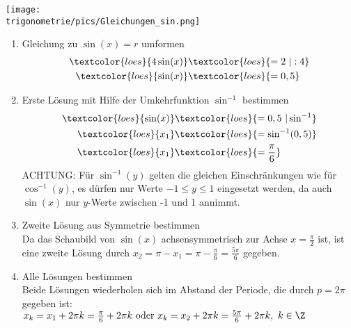 \begin{minipage}{\textwidth}
	\texttt{[image: \\trigonometrie/pics/Gleichungen\_sin.png]}\\
\end{minipage}
\begin{enumerate}
	\item Gleichung zu \(\sin(x)=r\) umformen
	\begin{align*}
		\textcolor{loes}{4\sin(x)}&\textcolor{loes}{=2\ \vert :4}\\
		\textcolor{loes}{\sin(x)}&\textcolor{loes}{=0,5}\\
	\end{align*}
	\item Erste Lösung mit Hilfe der Umkehrfunktion \(\sin^{-1}\) bestimmen
	\begin{align*}
		\textcolor{loes}{\sin(x)}&\textcolor{loes}{=0,5\ \vert \sin^{-1}}\\
		\textcolor{loes}{x_1}&\textcolor{loes}{=\sin^{-1}(0,5)}\\
		\textcolor{loes}{x_1}&\textcolor{loes}{=\frac{\pi}{6}}\\		
	\end{align*}
	\textcolor{loes}{ACHTUNG: Für \(\sin^{-1}(y)\) gelten die gleichen Einschränkungen wie für \(\cos^{-1}(y)\), es dürfen nur Werte \(-1\leq y \leq1\) eingesetzt werden, da auch \(\sin(x)\) nur \(y\)-Werte zwischen -1 und 1 annimmt.}
	\item Zweite Lösung aus Symmetrie bestimmen\\
	\textcolor{loes}{Da das Schaubild von \(\sin(x)\) achsensymmetrisch zur Achse \(x=\frac{\pi}{2}\) ist, ist eine zweite Lösung durch \(x_2=\pi-x_1=\pi-\frac{\pi}{6}=\frac{5\pi}{6}\) gegeben.}\\
	\item Alle Lösungen bestimmen\\
	\textcolor{loes}{Beide Lösungen wiederholen sich im Abstand der Periode, die durch \(p=2\pi\) gegeben ist:\\
		\(x_k=x_1+2\pi k=\frac{\pi}{6}+2\pi k\text{ oder } x_k=x_2+2\pi k=\frac{5\pi}{6}+2\pi k,\ k\in \Z\)} 
\end{enumerate}

